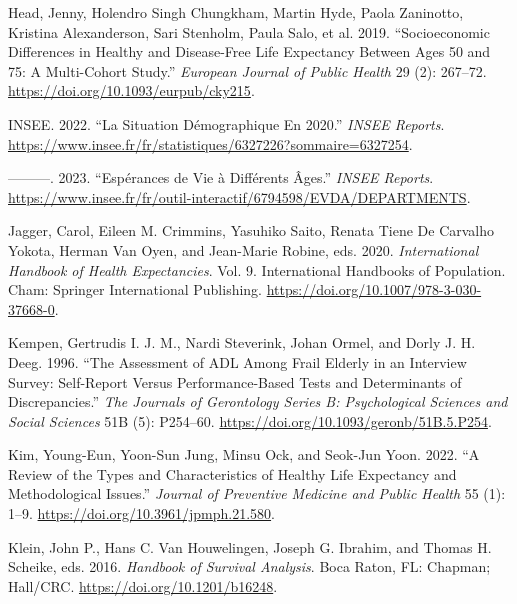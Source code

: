 \documentclass{article}
\newlength{\cslhangindent}
\newlength{\cslentryspacingunit} %
\newenvironment{CSLReferences}[2] %
 {%
  \setlength{\parindent}{0pt}
  \ifodd #1
  \let\oldpar\par
  \def\par{\hangindent=\cslhangindent\oldpar}
  \fi
  \setlength{\parskip}{#2\cslentryspacingunit}
 }%
 {}
\begin{document}
\begin{CSLReferences}{1}{0}
\leavevmode{}%
Head, Jenny, Holendro Singh Chungkham, Martin Hyde, Paola Zaninotto,
Kristina Alexanderson, Sari Stenholm, Paula Salo, et al. 2019.
{``Socioeconomic Differences in Healthy and Disease-Free Life Expectancy
Between Ages 50 and 75: A Multi-Cohort Study.''} \emph{European Journal
of Public Health} 29 (2): 267--72.
\url{https://doi.org/10.1093/eurpub/cky215}.

\leavevmode{}%
INSEE. 2022. {``La Situation Démographique En 2020.''} \emph{INSEE
Reports}.
\url{https://www.insee.fr/fr/statistiques/6327226?sommaire=6327254}.

\leavevmode{}%
---------. 2023. {``Espérances de Vie à Différents Âges.''} \emph{INSEE
Reports}.
\url{https://www.insee.fr/fr/outil-interactif/6794598/EVDA/DEPARTMENTS}.

\leavevmode{}%
Jagger, Carol, Eileen M. Crimmins, Yasuhiko Saito, Renata Tiene De
Carvalho Yokota, Herman Van Oyen, and Jean-Marie Robine, eds. 2020.
\emph{International {Handbook} of {Health} {Expectancies}}. Vol. 9.
International {Handbooks} of {Population}. Cham: Springer International
Publishing. \url{https://doi.org/10.1007/978-3-030-37668-0}.

\leavevmode{}%
Kempen, Gertrudis I. J. M., Nardi Steverink, Johan Ormel, and Dorly J.
H. Deeg. 1996. {``The {Assessment} of {ADL} Among {Frail} {Elderly} in
an {Interview} {Survey}: {Self}-Report Versus {Performance}-{Based}
{Tests} and {Determinants} of {Discrepancies}.''} \emph{The Journals of
Gerontology Series B: Psychological Sciences and Social Sciences} 51B
(5): P254--60. \url{https://doi.org/10.1093/geronb/51B.5.P254}.

\leavevmode{}%
Kim, Young-Eun, Yoon-Sun Jung, Minsu Ock, and Seok-Jun Yoon. 2022. {``A
{Review} of the {Types} and {Characteristics} of {Healthy} {Life}
{Expectancy} and {Methodological} {Issues}.''} \emph{Journal of
Preventive Medicine and Public Health} 55 (1): 1--9.
\url{https://doi.org/10.3961/jpmph.21.580}.

\leavevmode{}%
Klein, John P., Hans C. Van Houwelingen, Joseph G. Ibrahim, and Thomas
H. Scheike, eds. 2016. \emph{Handbook of {Survival} {Analysis}}. Boca
Raton, FL: Chapman; Hall/CRC. \url{https://doi.org/10.1201/b16248}.


\end{CSLReferences}
\end{document}
